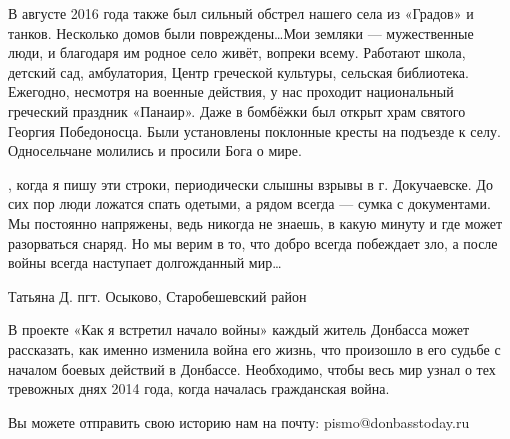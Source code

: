 В августе 2016 года также был сильный обстрел нашего села из «Градов» и танков.
Несколько домов были повреждены\ldots Мои земляки --- мужественные люди, и благодаря
им родное село живёт, вопреки всему. Работают школа, детский сад, амбулатория,
Центр греческой культуры, сельская библиотека. Ежегодно, несмотря на военные
действия, у нас проходит национальный греческий праздник «Панаир». Даже в
бомбёжки был открыт храм святого Георгия Победоносца. Были установлены
поклонные кресты на подъезде к селу. Односельчане молились и просили Бога о
мире.

, когда я пишу эти строки, периодически слышны взрывы в г. Докучаевске.
До сих пор люди ложатся спать одетыми, а рядом всегда --- сумка с документами. Мы
постоянно напряжены, ведь никогда не знаешь, в какую минуту и где может
разорваться снаряд. Но мы верим в то, что добро всегда побеждает зло, а после
войны всегда наступает долгожданный мир\ldots

Татьяна Д. пгт. Осыково, Старобешевский район

В проекте «Как я встретил начало войны» каждый житель Донбасса может
рассказать, как именно изменила война его жизнь, что произошло в его судьбе с
началом боевых действий в Донбассе. Необходимо, чтобы весь мир узнал о тех
тревожных днях 2014 года, когда началась гражданская война.

Вы можете отправить свою историю нам на почту: pismo@donbasstoday.ru

